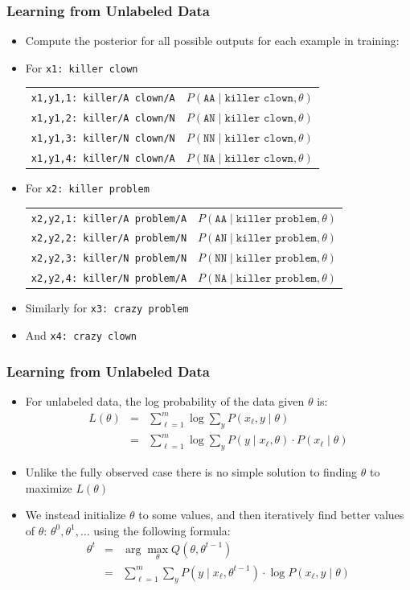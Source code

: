 \begin{frame}
\frametitle{Learning from Unlabeled Data}
\begin{itemize}[<+->]
\item Compute the posterior for all possible outputs for each example in training:
\item For {\tt x1: killer clown} \pause
{\small\begin{tabular}{ll}
{\tt x1,y1,1: killer/A clown/A} & $P(\texttt{AA} \mid \texttt{killer clown}, \theta)$ \pause \\
{\tt x1,y1,2: killer/A clown/N} & $P(\texttt{AN} \mid \texttt{killer clown}, \theta)$ \pause \\
{\tt x1,y1,3: killer/N clown/N} & $P(\texttt{NN} \mid \texttt{killer clown}, \theta)$ \pause \\
{\tt x1,y1,4: killer/N clown/A} & $P(\texttt{NA} \mid \texttt{killer clown}, \theta)$
\end{tabular}}
\item For {\tt x2: killer problem}
{\small\begin{tabular}{ll}
{\tt x2,y2,1: killer/A problem/A} & $P(\texttt{AA} \mid \texttt{killer problem}, \theta)$ \\
{\tt x2,y2,2: killer/A problem/N} & $P(\texttt{AN} \mid \texttt{killer problem}, \theta)$\\
{\tt x2,y2,3: killer/N problem/N} & $P(\texttt{NN} \mid \texttt{killer problem}, \theta)$\\
{\tt x2,y2,4: killer/N problem/A} & $P(\texttt{NA} \mid \texttt{killer problem}, \theta)$
\end{tabular}}
\item Similarly for {\tt x3: crazy problem} 
\item And {\tt x4: crazy clown}
\end{itemize}
\end{frame}


\begin{frame}
\frametitle{Learning from Unlabeled Data}
\begin{itemize}[<+->]
\item For unlabeled data, the log probability of the data given $\theta$ is:
\begin{eqnarray*}
 L(\theta) &=& \sum_{\ell=1}^m \log \sum_y P(x_\ell,y \mid \theta) \\
 &=& \sum_{\ell=1}^m \log \sum_y P(y \mid x_\ell, \theta) \cdot P(x_\ell \mid \theta)
 \end{eqnarray*}
\item Unlike the fully observed case there is no simple solution to finding $\theta$ to maximize $L(\theta)$
\item We instead initialize $\theta$ to some values, and then iteratively find better values of $\theta$: $\theta^0, \theta^1, \ldots$ using the following formula:
\begin{eqnarray*}
\theta^t &=& \arg\max_\theta Q(\theta, \theta^{t-1})\\
&=& \sum_{\ell=1}^m \sum_y P(y \mid x_\ell, \theta^{t-1}) \cdot \log P(x_\ell, y \mid \theta) 
\end{eqnarray*}
\end{itemize}
\end{frame}

